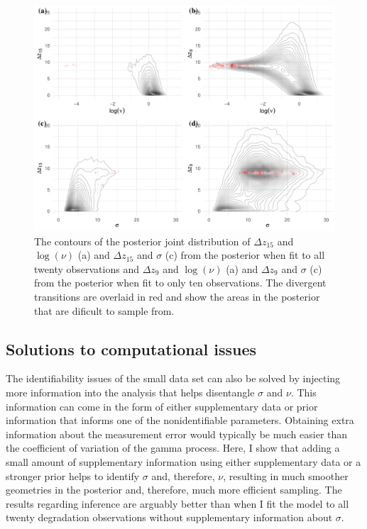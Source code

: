 \begin{figure}
  \centering
  \includegraphics[width=0.95\columnwidth]{./figures/ch-4/joint-sig-jump.pdf}
  \caption{The contours of the posterior joint distribution of $\Delta z_{15}$ and $\log(\nu)$ (a) and $\Delta z_{15}$ and $\sigma$ (c) from the posterior when fit to all twenty observations and $\Delta z_{9}$ and $\log(\nu)$ (a) and $\Delta z_{9}$ and $\sigma$ (c) from the posterior when fit to only ten observations. The divergent transitions are overlaid in red and show the areas in the posterior that are dificult to sample from.}
  \label{fig:z-jump-comparison}
\end{figure}

\subsection{Solutions to computational issues} \label{sec:comp-sols}

The identifiability issues of the small data set can also be solved by injecting more information into the analysis that helps disentangle $\sigma$ and $\nu$. This information can come in the form of either supplementary data or prior information that informs one of the nonidentifiable parameters. Obtaining extra information about the measurement error would typically be much easier than the coefficient of variation of the gamma process. Here, I show that adding a small amount of supplementary information using either supplementary data or a stronger prior helps to identify $\sigma$ and, therefore, $\nu$, resulting in much smoother geometries in the posterior and, therefore, much more efficient sampling. The results regarding inference are arguably better than when I fit the model to all twenty degradation observations without supplementary information about $\sigma$.

